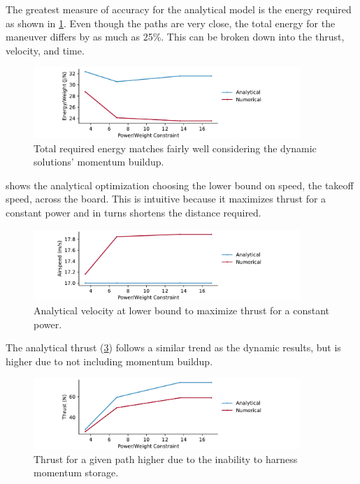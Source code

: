 \documentclass[10pt,english]{article}
\begin{document}
The greatest measure of accuracy for the analytical model is the energy required as shown in \cref{f:energy}.  Even though the paths are very close, the total energy for the maneuver differs by as much as 25\%.  This can be broken down into the thrust, velocity, and time.  

\begin{figure}[H]
\centering
\includegraphics[trim={.0cm 0.0cm .0cm 0cm},clip,width=0.9\textwidth]{total_energy_compare}
\vspace{-5pt}
\caption{Total required energy matches fairly well considering the dynamic solutions' momentum buildup.}
\label{f:energy}
\end{figure}

 shows the analytical optimization choosing the lower bound on speed, the takeoff speed, across the board.  This is intuitive because it maximizes thrust for a constant power and in turns shortens the distance required.  

\begin{figure}[H]
\centering
\includegraphics[trim={.0cm 0.0cm .0cm 0cm},clip,width=0.9\textwidth]{Va_compare}
\vspace{-5pt}
\caption{Analytical velocity at lower bound to maximize thrust for a constant power.}
\label{f:Va_compare}
\end{figure}

The analytical thrust (\cref{f:T_compare}) follows a similar trend as the dynamic results, but is higher due to not including momentum buildup.  

\begin{figure}[H]
\centering
\includegraphics[trim={.0cm 0.0cm .0cm 0cm},clip,width=0.9\textwidth]{T_compare}
\vspace{-5pt}
\caption{Thrust for a given path higher due to the inability to harness momentum storage.}
\label{f:T_compare}
\end{figure}
\end{document}
